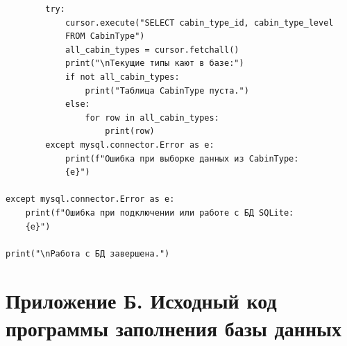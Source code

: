 \documentclass[11pt,a4paper,final]{article}
\begin{document}
{\begin{verbatim}
        try:
            cursor.execute("SELECT cabin_type_id, cabin_type_level 
            FROM CabinType")
            all_cabin_types = cursor.fetchall()
            print("\nТекущие типы кают в базе:")
            if not all_cabin_types:
                print("Таблица CabinType пуста.")
            else:
                for row in all_cabin_types:
                    print(row)
        except mysql.connector.Error as e:
            print(f"Ошибка при выборке данных из CabinType:
            {e}")

except mysql.connector.Error as e:
    print(f"Ошибка при подключении или работе с БД SQLite:
    {e}")

print("\nРабота с БД завершена.")
\end{verbatim}
}

\newpage
\section* {Приложение Б. Исходный код программы заполнения базы данных}
\end{document}
